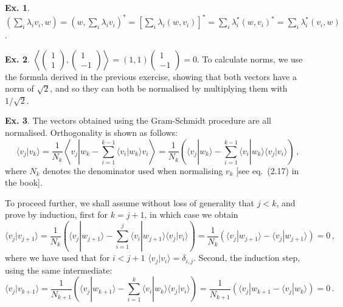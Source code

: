 \documentclass[a4paper,12pt]{article}
\theoremstyle{definition}
\newtheorem{exercise}{Ex.}[section]
\begin{document}
\begin{exercise}
 $(\sum_i \lambda_i v_i, w) = (w, \sum_i\lambda_i v_i)^* = \left[ \sum_i \lambda_i (w, v_i)\right]^*= \sum_i \lambda_i^* (w, v_i)^* = \sum_i \lambda_i^* (v_i, w)$.
\end{exercise}

\begin{exercise}
 $\left\langle \begin{pmatrix} 1\\ 1\end{pmatrix} , \begin{pmatrix} 1 \\ -1\end{pmatrix}\right\rangle = (1, 1)\begin{pmatrix}1 \\ -1\end{pmatrix} = 0$. To calculate norms, we use the formula derived in the previous exercise, showing that both vectors have a norm of $\sqrt{2}$, and so they can both be normalised by multiplying them with $1/\sqrt{2}$.
\end{exercise}

\begin{exercise}
 The vectors obtained using the Gram-Schmidt procedure are all normalised. Orthogonality is shown as follows:
 \[
  \langle v_j| v_k\rangle = \frac{1}{N_k}\left\langle
  v_j \left|
  w_k - \sum_{i=1}^{k-1} \langle v_i | w_k\rangle v_i 
  \right.\right\rangle =
  \frac{1}{N_k}\left(
  \langle v_j| w_k \rangle
  - \sum_{i=1}^{k-1} \langle v_i | w_k\rangle \langle v_j | v_i\rangle
  \right)\,,
 \]
 where $N_k$ denotes the denominator used when normalising $v_k$ [see eq.\ (2.17) in the book].
 
 To proceed further, we shall assume without loss of generality that $j <k$, and prove by induction, first for $k=j+1$, in which case we obtain
 \[
  \langle v_j | v_{j+1}\rangle = \frac{1}{N_k}\left( \langle v_j | w_{j+1}\rangle - \sum_{i=1}^j \langle v_i| w_{j+1}\rangle \langle v_j | v_i\rangle\right) = \frac{1}{N_k}( \langle v_j | w_{j+1}\rangle - \langle v_j | w_{j+1} \rangle ) = 0\,,
 \]
 where we have used that for $i< j+1$ $\langle v_j| v_i\rangle = \delta_{i,j}$. Second, the induction step, using the same intermediate:
 \[
  \langle v_j | v_{k+1}\rangle = \frac{1}{N_{k+1}}\left(
    \langle v_j | w_{k+1} \rangle - \sum_{i=1}^k \langle v_i| w_k\rangle \langle v_j | v_i\rangle
  \right) = \frac{1}{N_{k+1}}\left(
  \langle v_j| w_{k+1} - \langle v_j | w_k \rangle
  \right) = 0\,.
 \]
\end{exercise}
\end{document}
